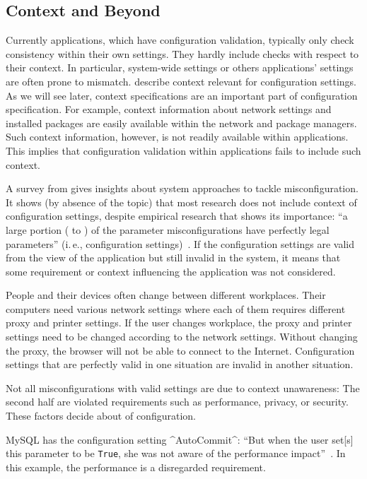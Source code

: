 \subsection{Context and Beyond}

Currently applications, which have configuration validation, typically only check consistency within their own settings.
They hardly include checks with respect to their context.
In particular, system-wide settings or others applications' settings are often prone to mismatch.
 describe context relevant for configuration settings.
As we will see later, context specifications are an important part of configuration specification.
For example, context information about network settings and installed packages are easily available within the network and package managers.
Such context information, however, is not readily available within applications.
This implies that configuration validation within applications fails to include such context.


A survey from \citet{xu2015systems} gives insights about system approaches to tackle misconfiguration.
It shows (by absence of the topic) that most research does not include context of configuration settings, despite empirical research that shows its importance:
\enquote{a large portion ( to ) of the parameter misconfigurations have perfectly legal parameters} (i.\,e., configuration settings)~\cite{yin2011empirical}.
If the configuration settings are valid from the view of the application but still invalid in the system, it means that some requirement or context influencing the application was not considered.

\begin{example}
\label{ex:workplaces-proxy}
People and their devices often change between different workplaces.
Their computers need various network settings where each of them requires different proxy and printer settings.
If the user changes workplace, the proxy and printer settings need to be changed according to the network settings.
Without changing the proxy, the browser will not be able to connect to the Internet.
Configuration settings that are perfectly valid in one situation are invalid in another situation.
\end{example}

Not all misconfigurations with valid settings are due to context unawareness:
The second half are violated requirements such as performance, privacy, or security.
These factors decide about  of configuration.
\begin{example}
MySQL has the configuration setting ^AutoCommit^:
\enquote{But when the user set[s] this parameter to be \texttt{True}, she was not aware of the performance impact}~\cite{yin2011empirical}.
In this example, the performance is a disregarded requirement.
\end{example}

